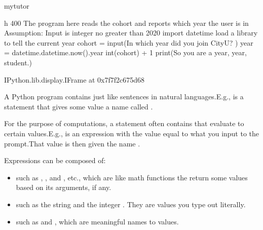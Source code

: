 \documentclass[letterpaper,10pt,english]{sphinxmanual}
\begin{document}

\begin{sphinxVerbatim}[commandchars=\\\{\}]
 mytutor
\end{sphinxVerbatim}

\begin{sphinxVerbatim}[commandchars=\\\{\}]
 \PYGZhy{}h 400
\PYGZsh{} The program here reads the cohort and reports which year the user is in
\PYGZsh{} Assumption: Input is integer no greater than 2020
import datetime  \PYGZsh{} load a library to tell the current year
cohort = input(\PYGZdq{}In which year did you join CityU? \PYGZdq{})
year = datetime.datetime.now().year \PYGZhy{} int(cohort) + 1
print(\PYGZdq{}So you are a year\PYGZdq{}, year, \PYGZdq{}student.\PYGZdq{})
\end{sphinxVerbatim}

\begin{sphinxVerbatim}[commandchars=\\\{\}]
\PYGZlt{}IPython.lib.display.IFrame at 0x7f7f2c675d68\PYGZgt{}
\end{sphinxVerbatim}

A Python program contains  just like sentences in natural languages.E.g.,  is a statement that gives some value a name called .

For the purpose of computations, a statement often contains  that evaluate to certain values.E.g.,  is an expression with the value equal to what you input to the prompt.That value is then given the name .

Expressions can be composed of:
\begin{itemize}
\item {} 
 such as , , and , etc., which are like math functions the return some values based on its arguments, if any.

\item {} 
 such as the string  and the integer . They are values you type out literally.

\item {} 
 such as  and , which are meaningful names to values.

\end{itemize}
\end{document}
